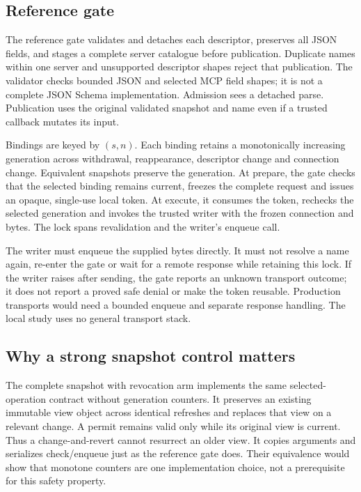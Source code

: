 \subsection{Reference gate}
The reference gate validates and detaches each descriptor, preserves all JSON
fields, and stages a complete server catalogue before publication. Duplicate names
within one server and unsupported descriptor shapes reject that publication. The
validator checks bounded JSON and selected MCP field shapes; it is not a complete
JSON Schema implementation. Admission sees a detached parse. Publication uses the
original validated snapshot and name even if a trusted callback mutates its input.

Bindings are keyed by $(s,n)$. Each binding retains a monotonically increasing
generation across withdrawal, reappearance, descriptor change and connection change.
Equivalent snapshots preserve the generation. At prepare, the gate checks that the
selected binding remains current, freezes the complete request and issues an opaque,
single-use local token. At execute, it consumes the token, rechecks the selected
generation and invokes the trusted writer with the frozen connection and bytes.
The lock spans revalidation and the writer's enqueue call.

The writer must enqueue the supplied bytes directly. It must not resolve a name
again, re-enter the gate or wait for a remote response while retaining this lock.
If the writer raises after sending, the gate reports an unknown transport outcome;
it does not report a proved safe denial or make the token reusable. Production
transports would need a bounded enqueue and separate response handling. The local
study uses no general transport stack.

\subsection{Why a strong snapshot control matters}
The complete snapshot with revocation arm implements the same selected-operation
contract without generation counters. It preserves an existing immutable view object
across identical refreshes and replaces that view on a relevant change. A permit
remains valid only while its original view is current. Thus a change-and-revert
cannot resurrect an older view. It copies arguments and serializes check/enqueue
just as the reference gate does. Their equivalence would show that monotone
counters are one implementation choice, not a prerequisite for this safety property.

